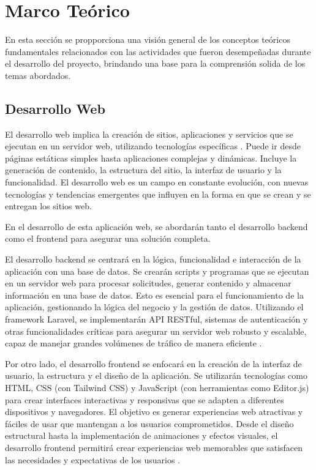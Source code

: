 \section{Marco Teórico}
En esta sección se propporciona una visión general de los conceptos teóricos fundamentales relacionados con las actividades que fueron desempeñadas durante el desarrollo del proyecto, brindando una base para la comprensión solida de los temas abordados.

\subsection{Desarrollo Web}
El desarrollo web implica la creación de sitios, aplicaciones y servicios que se ejecutan en un servidor web, utilizando tecnologías específicas \cite{webserver}. Puede ir desde páginas estáticas simples hasta aplicaciones complejas y dinámicas. Incluye la generación de contenido, la estructura del sitio, la interfaz de usuario y la funcionalidad. El desarrollo web es un campo en constante evolución, con nuevas tecnologías y tendencias emergentes que influyen en la forma en que se crean y se entregan los sitios web.

En el desarrollo de esta aplicación web, se abordarán tanto el desarrollo backend como el frontend para asegurar una solución completa. 

El desarrollo backend se centrará en la lógica, funcionalidad e interacción de la aplicación con una base de datos. Se crearán scripts y programas que se ejecutan en un servidor web para procesar solicitudes, generar contenido y almacenar información en una base de datos. Esto es esencial para el funcionamiento de la aplicación, gestionando la lógica del negocio y la gestión de datos. Utilizando el framework Laravel, se implementarán API RESTful, sistemas de autenticación y otras funcionalidades críticas para asegurar un servidor web robusto y escalable, capaz de manejar grandes volúmenes de tráfico de manera eficiente \cite{backend}.

Por otro lado, el desarrollo frontend se enfocará en la creación de la interfaz de usuario, la estructura y el diseño de la aplicación. Se utilizarán tecnologías como HTML, CSS (con Tailwind CSS) y JavaScript (con herramientas como Editor.js) para crear interfaces interactivas y responsivas que se adapten a diferentes dispositivos y navegadores. El objetivo es generar experiencias web atractivas y fáciles de usar que mantengan a los usuarios comprometidos. Desde el diseño estructural hasta la implementación de animaciones y efectos visuales, el desarrollo frontend permitirá crear experiencias web memorables que satisfacen las necesidades y expectativas de los usuarios \cite{frontend}.

